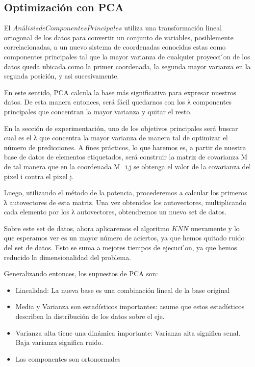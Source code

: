 \subsection {Optimización con PCA}


El $Análisis de Componentes Principales$ utiliza una transformación lineal ortogonal de los datos para convertir un conjunto de variables, posiblemente correlacionadas, a un nuevo sistema de coordenadas conocidas estas como componentes principales tal que la mayor varianza de cualquier proyecci ́on de los datos queda ubicada como la primer coordenada, la segunda mayor varianza en la segunda posición, y asi sucesivamente.

En este sentido, PCA calcula la base más significativa para expresar nuestros datos.
De esta manera entonces, será fácil quedarnos con los λ componentes principales que concentran la mayor varianza y quitar el resto.

En la sección de experimentación, uno de los objetivos principales será buscar cual es el λ que concentra la mayor varianza de manera tal de optimizar el número de predicciones. A fines prácticos, lo que haremos es, a partir de nuestra base de datos de elementos etiquetados, será construir la matriz de covarianza M de tal manera que en la coordenada M_{i,j} se obtenga el valor de la covarianza del pixel i contra el pixel j.

Luego, utilizando el método de la potencia, procederemos a calcular los primeros λ autovectores de esta matriz. Una vez obtenidos los
autovectores, multiplicando cada elemento por los λ autovectores, obtendremos un nuevo set de datos.

Sobre este set de datos, ahora aplicaremos el algoritmo $KNN$ nuevamente y lo que esperamos ver es un mayor número de aciertos, ya que hemos quitado ruido del set de datos. Esto se suma a mejores tiempos de ejecuci ́on, ya que hemos reducido la dimensionalidad del problema.

Generalizando entonces, los supuestos de PCA son:

\begin{itemize}
    \item Linealidad: La nueva base es una combinación lineal de la base original
    \item Media y Varianza son estadísticos importantes: asume que estos estadísticos describen la distribución de los datos sobre el eje.
    \item Varianza alta tiene una dinámica importante: Varianza alta significa senal. Baja varianza significa ruido.
    \item Las componentes son ortonormales
\end{itemize}


